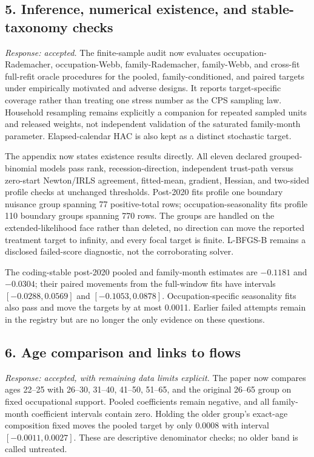 \documentclass[11pt,letterpaper]{article}
\begin{document}
\subsection*{5. Inference, numerical existence, and stable-taxonomy checks}

\emph{Response: accepted.}  The finite-sample audit now evaluates occupation-Rademacher, occupation-Webb, family-Rademacher, family-Webb, and cross-fit full-refit oracle procedures for the pooled, family-conditioned, and paired targets under empirically motivated and adverse designs.  It reports target-specific coverage rather than treating one stress number as the CPS sampling law.  Household resampling remains explicitly a companion for repeated sampled units and released weights, not independent validation of the saturated family-month parameter.  Elapsed-calendar HAC is also kept as a distinct stochastic target.

The appendix now states existence results directly.  All eleven declared grouped-binomial models pass rank, recession-direction, independent trust-path versus zero-start Newton/IRLS agreement, fitted-mean, gradient, Hessian, and two-sided profile checks at unchanged thresholds.  Post-2020 fits profile one boundary nuisance group spanning 77 positive-total rows; occupation-seasonality fits profile 110 boundary groups spanning 770 rows.  The groups are handled on the extended-likelihood face rather than deleted, no direction can move the reported treatment target to infinity, and every focal target is finite.  L-BFGS-B remains a disclosed failed-score diagnostic, not the corroborating solver.

The coding-stable post-2020 pooled and family-month estimates are $-0.1181$ and $-0.0304$; their paired movements from the full-window fits have intervals $[-0.0288,0.0569]$ and $[-0.1053,0.0878]$.  Occupation-specific seasonality fits also pass and move the targets by at most 0.0011.  Earlier failed attempts remain in the registry but are no longer the only evidence on these questions.

\subsection*{6. Age comparison and links to flows}

\emph{Response: accepted, with remaining data limits explicit.}  The paper now compares ages 22--25 with 26--30, 31--40, 41--50, 51--65, and the original 26--65 group on fixed occupational support.  Pooled coefficients remain negative, and all family-month coefficient intervals contain zero.  Holding the older group's exact-age composition fixed moves the pooled target by only 0.0008 with interval $[-0.0011,0.0027]$.  These are descriptive denominator checks; no older band is called untreated.
\end{document}
